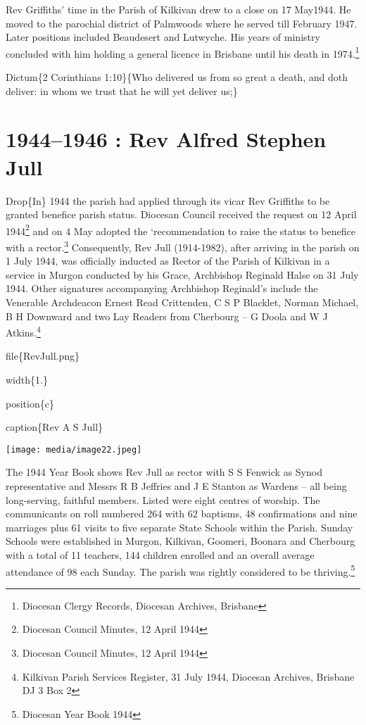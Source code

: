 Rev Griffiths' time in the Parish of Kilkivan drew to a close on 17 May1944. He moved to the parochial district of Palmwoods where he served till February 1947. Later positions included Beaudesert and Lutwyche. His years of ministry concluded with him holding a general licence in Brisbane until his death in 1974.\footnote{Diocesan Clergy Records, Diocesan Archives, Brisbane}

Dictum\{2 Corinthians 1:10\}\{Who delivered us from so great a death, and doth deliver: in whom we trust that he will yet deliver us;\}

\hypertarget{rev-alfred-stephen-jull}{%
\chapter{1944--1946 : Rev Alfred Stephen Jull}\label{rev-alfred-stephen-jull}}

Drop\{In\} 1944 the parish had applied through its vicar Rev Griffiths to be granted benefice parish status. Diocesan Council received the request on 12 April 1944\footnote{Diocesan Council Minutes, 12 April 1944} and on 4 May adopted the `recommendation to raise the status to benefice with a rector.\footnote{Diocesan Council Minutes, 12 April 1944} Consequently, Rev Jull (1914-1982), after arriving in the parish on 1 July 1944, was officially inducted as Rector of the Parish of Kilkivan in a service in Murgon conducted by his Grace, Archbishop Reginald Halse on 31 July 1944. Other signatures accompanying Archbishop Reginald's include the Venerable Archdeacon Ernest Read Crittenden, C S P Blacklet, Norman Michael, B H Downward and two Lay Readers from Cherbourg -- G Doola and W J Atkins.\footnote{Kilkivan Parish Services Register, 31 July 1944, Diocesan Archives, Brisbane DJ 3 Box 2}

file\{RevJull.png\}

width\{1.\}

position\{c\}

caption\{Rev A S Jull\}

\texttt{[image: media/image22.jpeg]}

The 1944 Year Book shows Rev Jull as rector with S S Fenwick as Synod representative and Messrs R B Jeffries and J E Stanton as Wardens -- all being long-serving, faithful members. Listed were eight centres of worship. The communicants on roll numbered 264 with 62 baptisms, 48 confirmations and nine marriages plus 61 visits to five separate State Schools within the Parish. Sunday Schools were established in Murgon, Kilkivan, Goomeri, Boonara and Cherbourg with a total of 11 teachers, 144 children enrolled and an overall average attendance of 98 each Sunday. The parish was rightly considered to be thriving.\footnote{Diocesan Year Book 1944}


